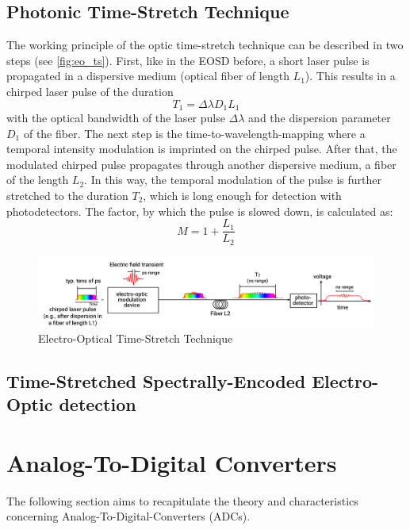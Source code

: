 \subsection{Photonic Time-Stretch Technique}
The working principle of the optic time-stretch technique can be described in two steps (see \autoref{fig:eo_ts}). First, like in the EOSD before, a short laser pulse is propagated in a dispersive medium (optical fiber of length $L_1$). This results in a chirped laser pulse of the duration
\begin{equation}
	T_1 = \Delta \lambda D_1 L_1
\end{equation}
with the optical bandwidth of the laser pulse $\Delta \lambda$  and the dispersion parameter $D_1$ of the fiber.  The next step is the time-to-wavelength-mapping where a temporal intensity modulation is imprinted on the chirped pulse. After that, the modulated chirped pulse propagates through another dispersive medium, a fiber of the length $L_2$. In this way, the temporal modulation of the pulse is further stretched to the duration $T_2$, which is long enough for detection with photodetectors. \cite{roussel2014}
The factor, by which the pulse is slowed down, is calculated as:
\begin{equation}
	M = 1 + \frac{L_1}{L_2}
\end{equation}
\begin{figure}[H]
	\centering
	\includegraphics[width = \textwidth]{chap/02-theory/img/time_stretch.png}
	\caption{Electro-Optical Time-Stretch Technique \cite{szwaj}}
	\label{fig:eo_ts}
\end{figure}

\subsection{Time-Stretched Spectrally-Encoded Electro-Optic detection}

\newpage


\section{Analog-To-Digital Converters}
The following section aims to recapitulate the theory and characteristics concerning Analog-To-Digital-Converters (ADCs).
